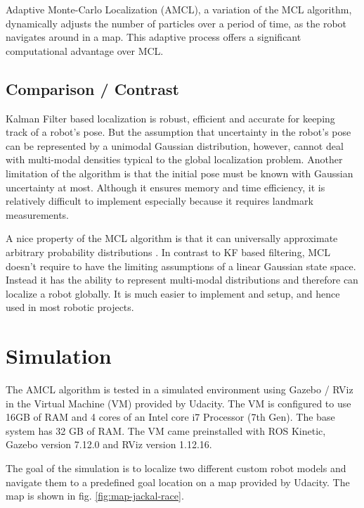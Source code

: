 \documentclass[10pt,journal,compsoc]{IEEEtran}
\begin{document}
Adaptive Monte-Carlo Localization (AMCL), a variation of the MCL algorithm, dynamically adjusts the number of particles over a period of time, as the robot navigates around in a map. This adaptive process offers a significant computational advantage over MCL.


\subsection{Comparison / Contrast}
Kalman Filter based localization is robust, efficient and accurate for keeping track of a robot’s pose. But the assumption that uncertainty in the robot’s pose can be represented by a unimodal Gaussian distribution, however, cannot deal with multi-modal densities typical to the global localization problem. Another limitation of the algorithm is that the initial pose must be known with Gaussian uncertainty at most. Although it ensures memory and time efficiency, it is relatively difficult to implement especially because it requires landmark measurements.

A nice property of the MCL algorithm is that it can universally approximate arbitrary probability distributions \cite{fox1999monte}. In contrast to KF based filtering, MCL doesn't require to have the limiting assumptions of a linear Gaussian state space. Instead it has the ability to represent multi-modal distributions and therefore can localize a robot globally. It is much easier to implement and setup, and hence used in most robotic projects.

\section{Simulation}
The AMCL algorithm is tested in a simulated environment using Gazebo / RViz in the Virtual Machine (VM) provided by Udacity. The VM is configured to use 16GB of RAM and 4 cores of an Intel core i7 Processor (7th Gen). The base system has 32 GB of RAM. The VM came preinstalled with ROS Kinetic, Gazebo version 7.12.0 and RViz version 1.12.16.

The goal of the simulation is to localize two different custom robot models and navigate them to a predefined goal location on a map provided by Udacity. The map is shown in fig. \ref{fig:map-jackal-race}.
\end{document}
